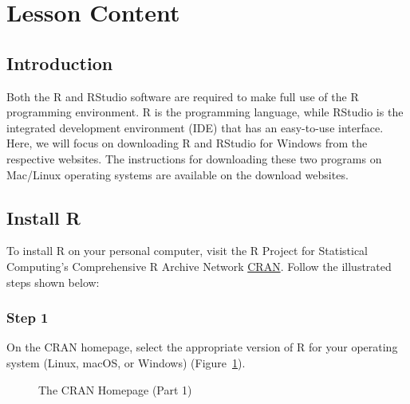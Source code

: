 \documentclass[
  letterpaper,
  DIV=11,
  numbers=noendperiod]{scrreprt}
\begin{document}
\section{Lesson Content}\label{lesson-content-1}

\subsection{Introduction}\label{introduction-1}

Both the R and RStudio software are required to make full use of the R
programming environment. R is the programming language, while RStudio is
the integrated development environment (IDE) that has an easy-to-use
interface. Here, we will focus on downloading R and RStudio for Windows
from the respective websites. The instructions for downloading these two
programs on Mac/Linux operating systems are available on the download
websites.

\subsection{Install R}\label{install-r}

To install R on your personal computer, visit the R Project for
Statistical Computing's Comprehensive R Archive Network
\href{https://cloud.r-project.org/}{CRAN}. Follow the illustrated steps
shown below:

\subsubsection{Step 1}\label{step-1}

On the CRAN homepage, select the appropriate version of R for your
operating system (Linux, macOS, or Windows) (Figure~\ref{fig-cran-1}).

\begin{figure}


\caption{\label{fig-cran-1}The CRAN Homepage (Part 1)}

\end{figure}%
\end{document}
